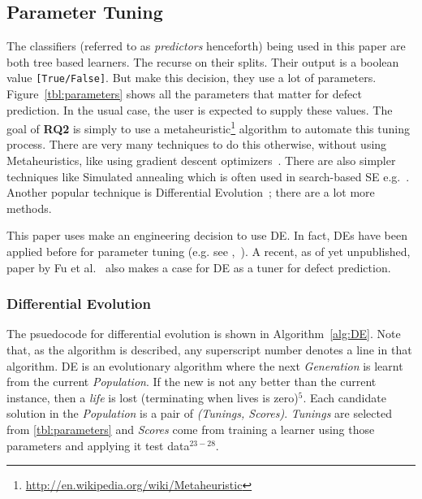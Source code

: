 \documentclass[12pt]{IEEEtran}
\begin{document}
\subsection{Parameter Tuning}
The classifiers (referred to as \textit{predictors} henceforth) being used in this paper are both tree based learners. The recurse on their splits. Their output is a boolean value \texttt{[True/False]}. But make this decision, they use a lot of parameters. Figure~\ref{tbl:parameters} shows all the parameters that matter for defect prediction. In the usual case, the user is expected to supply these values. The goal of {\bfseries RQ2} is simply to use a metaheuristic\footnote{\url{http://en.wikipedia.org/wiki/Metaheuristic}} algorithm to automate this tuning process. There are very many techniques to do this otherwise, without using Metaheuristics, like using gradient
descent optimizers~\cite{salt00}. There are also simpler techniques like Simulated annealing which is often used in search-based SE e.g.~\cite{fea02a,me07f}. Another popular technique is Differential Evolution~\cite{storn97}; there are a lot more methods. 

This paper uses make an engineering decision to use DE. In fact, DEs have been applied before for parameter tuning (e.g. see \cite{chiha12},~\cite{om07}). A recent, as of yet unpublished, paper by Fu et al.~\cite{Fu} also makes a case for DE as a tuner for defect prediction. 

\subsubsection*{Differential Evolution}
The psuedocode for differential evolution is shown in Algorithm~\ref{alg:DE}.
Note that, as the algorithm is described,
any superscript number denotes a line in that algorithm.
DE is an evolutionary algorithm where the next {\em Generation} is learnt from
the current {\em Population}.  If the new is not any better than the current instance, then a \textit{life} is lost (terminating when lives is zero)$^5$.
Each candidate solution in the {\em Population}  
is a pair of {\em (Tunings, Scores)}.  {\em Tunings} are selected from \ref{tbl:parameters} and {\em Scores} come from training a learner using those parameters
and applying it test data$^{23-28}$.
\end{document}
